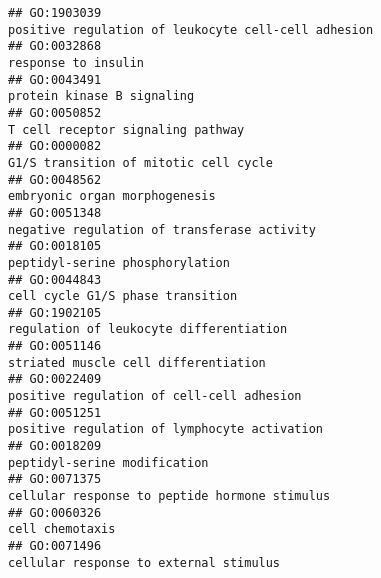 \documentclass[
]{article}
\begin{document}
\begin{verbatim}
## GO:1903039                                                                                              positive regulation of leukocyte cell-cell adhesion
## GO:0032868                                                                                                                              response to insulin
## GO:0043491                                                                                                                       protein kinase B signaling
## GO:0050852                                                                                                                T cell receptor signaling pathway
## GO:0000082                                                                                                            G1/S transition of mitotic cell cycle
## GO:0048562                                                                                                                    embryonic organ morphogenesis
## GO:0051348                                                                                                      negative regulation of transferase activity
## GO:0018105                                                                                                                  peptidyl-serine phosphorylation
## GO:0044843                                                                                                                 cell cycle G1/S phase transition
## GO:1902105                                                                                                          regulation of leukocyte differentiation
## GO:0051146                                                                                                             striated muscle cell differentiation
## GO:0022409                                                                                                        positive regulation of cell-cell adhesion
## GO:0051251                                                                                                     positive regulation of lymphocyte activation
## GO:0018209                                                                                                                     peptidyl-serine modification
## GO:0071375                                                                                                    cellular response to peptide hormone stimulus
## GO:0060326                                                                                                                                  cell chemotaxis
## GO:0071496                                                                                                           cellular response to external stimulus

\end{verbatim}
\end{document}
